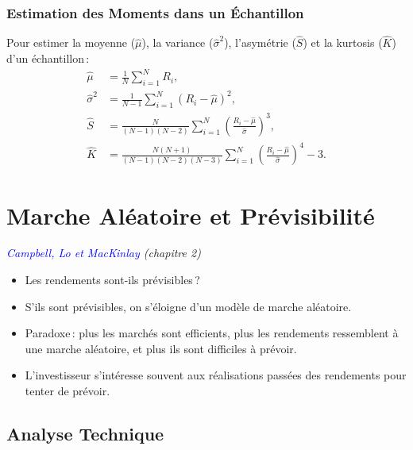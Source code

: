 \documentclass[14pt]{extarticle} %
\newcommand{\livre}[1]{\textcolor{blue}{#1}}
\begin{document}
\subsubsection{Estimation des Moments dans un Échantillon}

Pour estimer la moyenne (\(\hat{\mu}\)), la variance (\(\hat{\sigma}^2\)), l’asymétrie (\(\hat{S}\)) et la kurtosis (\(\hat{K}\)) d’un échantillon :
\begin{align*}
    \hat{\mu} &= \frac{1}{N} \sum_{i=1}^N R_i, \\
    \hat{\sigma}^2 &= \frac{1}{N-1} \sum_{i=1}^N (R_i - \hat{\mu})^2, \\
    \hat{S} &= \frac{N}{(N-1)(N-2)} \sum_{i=1}^N \left( \frac{R_i - \hat{\mu}}{\hat{\sigma}} \right)^3, \\
    \hat{K} &= \frac{N(N+1)}{(N-1)(N-2)(N-3)} \sum_{i=1}^N \left( \frac{R_i - \hat{\mu}}{\hat{\sigma}} \right)^4 - 3.
\end{align*}

\section{Marche Aléatoire et Prévisibilité}

\textit{\livre{Campbell, Lo et MacKinlay} (chapitre 2)}

\begin{itemize}
    \item Les rendements sont-ils prévisibles ?
    \item S’ils sont prévisibles, on s’éloigne d’un modèle de marche aléatoire.
    \item Paradoxe : plus les marchés sont efficients, plus les rendements ressemblent à une marche aléatoire, et plus ils sont difficiles à prévoir.
    \item L’investisseur s’intéresse souvent aux réalisations passées des rendements pour tenter de prévoir.
\end{itemize}

\subsection{Analyse Technique}
\end{document}
